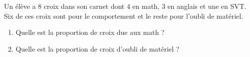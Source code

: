 
\begin{exercice}\label{exo2smath-0320}

    Un élève a \( 8\) croix dans son carnet dont \( 4\) en math, \( 3\) en anglais et une en SVT. Six de ces croix sont pour le comportement et le reste pour l'oubli de matériel.
    \begin{enumerate}
        \item
            Quelle est la proportion de croix due aux math ?
        \item
            Quelle est la proportion de croix d'oubli de matériel ?
    \end{enumerate}

\end{exercice}

